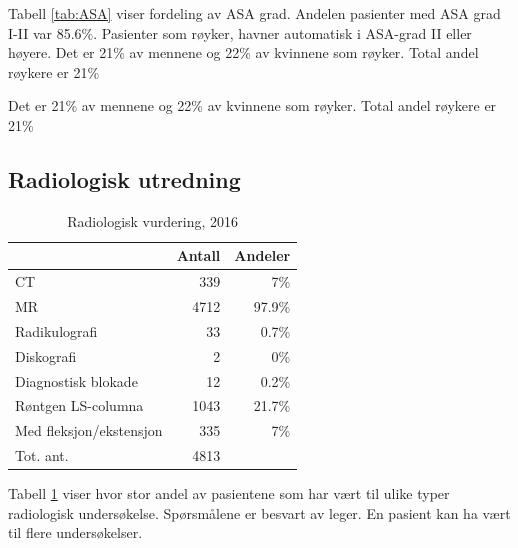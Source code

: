 \documentclass [norsk,a4paper,twoside]{article}\usepackage[]{graphicx}\usepackage[]{color}
\begin{document}
Tabell \ref{tab:ASA} viser fordeling av ASA grad. Andelen pasienter med ASA grad I-II 
var 85.6\%. Pasienter som røyker, havner automatisk i ASA-grad II eller høyere. 
Det er 21\% av mennene og 22\% av kvinnene som røyker. 
Total andel røykere er 21\%



Det er 21\% av mennene og 22\% av kvinnene som røyker. 
Total andel røykere er 21\%





\subsection{Radiologisk utredning}

\begin{table}[ht]
\centering
\begin{tabular}{lrr}
  \hline
 & Antall & Andeler \\ 
  \hline
CT & 339 & 7\% \\ 
  MR & 4712 & 97.9\% \\ 
  Radikulografi & 33 & 0.7\% \\ 
  Diskografi & 2 & 0\% \\ 
  Diagnostisk blokade & 12 & 0.2\% \\ 
  Røntgen LS-columna & 1043 & 21.7\% \\ 
  Med fleksjon/ekstensjon & 335 & 7\% \\ 
  Tot. ant. & 4813 &   \\ 
   \hline
\end{tabular}
\caption{Radiologisk vurdering, 2016} 
\label{tab:RV}
\end{table}


Tabell \ref{tab:RV} viser hvor stor andel av pasientene som har vært til ulike typer 
radiologisk undersøkelse. 
Spørsmålene er besvart av leger. En pasient kan ha vært til flere undersøkelser.
\end{document}
